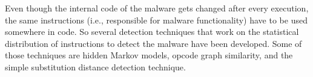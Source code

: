 Even though the internal code of the malware gets changed after every execution, the same instructions (i.e., responsible for malware functionality) have to be used somewhere in code. So several detection techniques that work on the statistical distribution of instructions to detect the malware have been developed. Some of those techniques are hidden Markov models, opcode graph similarity, and the simple substitution distance detection technique.


